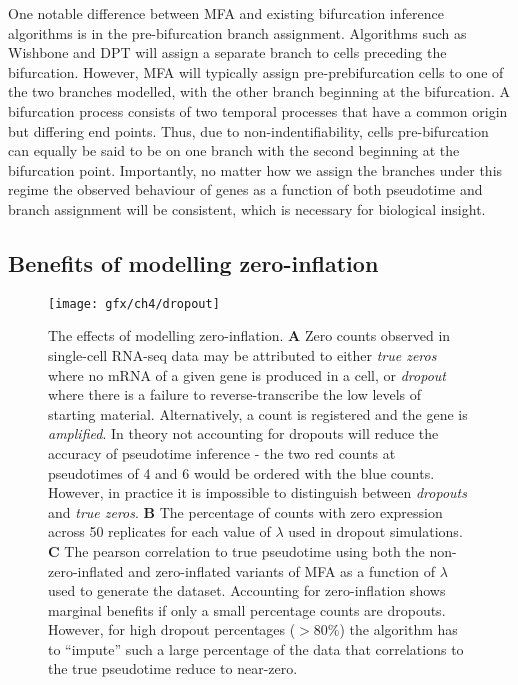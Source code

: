 One notable difference between MFA and existing bifurcation inference algorithms is in the pre-bifurcation branch assignment. Algorithms such as Wishbone and DPT will assign a separate branch to cells preceding the bifurcation. However, MFA will typically assign pre-prebifurcation cells to one of the two branches modelled, with the other branch beginning at the bifurcation. A bifurcation process consists of two temporal processes that have a common origin but differing end points. Thus, due to non-indentifiability, cells pre-bifurcation can equally be said to be on one branch with the second beginning at the bifurcation point. Importantly, no matter how we assign the branches under this regime the observed behaviour of genes as a function of both pseudotime and branch assignment will be consistent, which is necessary for biological insight.

\subsection{Benefits of modelling zero-inflation}

\begin{figure}
	\centering
	\texttt{[image: gfx/ch4/dropout]}
	\caption{The effects of modelling zero-inflation. {\normalfont
\textbf{A} Zero counts observed in single-cell RNA-seq data may be attributed to either \emph{true zeros} where no mRNA of a given gene is produced in a cell, or \emph{dropout} where there is a failure to reverse-transcribe the low levels of starting material. Alternatively, a count is registered and the gene is \emph{amplified}. In theory not accounting for dropouts will reduce the accuracy of pseudotime inference - the two red counts at pseudotimes of 4 and 6 would be ordered with the blue counts. However, in practice it is impossible to distinguish between \emph{dropouts} and \emph{true zeros}.
\textbf{B} The percentage of counts with zero expression across 50 replicates for each value of $\lambda$ used in dropout simulations.
\textbf{C} The pearson correlation to true pseudotime using both the non-zero-inflated and zero-inflated variants of MFA as a function of $\lambda$ used to generate the dataset. Accounting for zero-inflation shows marginal benefits if only a small percentage counts are dropouts. However, for high dropout percentages ($>80\%$) the algorithm has to ``impute'' such a large percentage of the data that correlations to the true pseudotime reduce to near-zero.
	}} \label{fig:dropout}
\end{figure}

